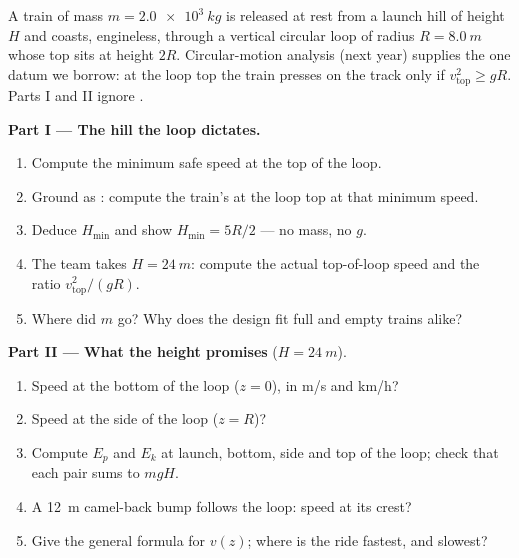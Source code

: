 \begin{problem}
\label{pb:g11:mechanical-energy:1}
A train of mass $m = \qty{2.0e3}{kg}$ is released at rest from a launch
hill of height $H$ and coasts, engineless, through a vertical circular
loop of radius $R = \qty{8.0}{m}$ whose top sits at height $2R$.
Circular-motion analysis (next year) supplies the one datum we borrow: at
the loop top the train presses on the track only if
$v_{\text{top}}^2 \geq gR$. Parts I and II ignore .

\medskip
\noindent\textbf{Part I --- The hill the loop dictates.}
\begin{enumerate}
  \item Compute the minimum safe speed at the top of the loop.
  \item Ground as : compute the train's  at the loop top at that minimum speed.
  \item Deduce $H_{\min}$ and show $H_{\min} = 5R/2$ --- no mass, no $g$.
  \item The team takes $H = \qty{24}{m}$: compute the actual top-of-loop
        speed and the ratio $v_{\text{top}}^2/(gR)$.
  \item Where did $m$ go? Why does the design fit full and empty
        trains alike?
\end{enumerate}

\medskip
\noindent\textbf{Part II --- What the height promises} ($H = \qty{24}{m}$).
\begin{enumerate}[resume]
  \item Speed at the bottom of the loop ($z = 0$), in \unit{m/s} and
        \unit{km/h}?
  \item Speed at the side of the loop ($z = R$)?
  \item Compute $E_p$ and $E_k$ at launch, bottom, side and top of
        the loop; check that each pair sums to $mgH$.
  \item A \qty{12}{m} camel-back bump follows the loop: speed at its crest?
  \item Give the general formula for $v(z)$; where is the ride
        fastest, and slowest?
\end{enumerate}


\end{problem}

